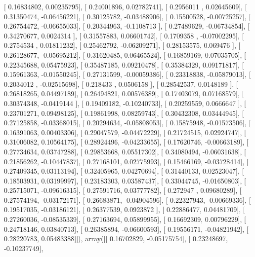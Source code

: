 \documentclass{article}
\begin{document}
       [ 0.16834802,  0.00235795],
       [ 0.24001896,  0.02782741],
       [ 0.2956011 ,  0.02645609],
       [ 0.31350474, -0.06456221],
       [ 0.30125782, -0.03488906],
       [ 0.15500528, -0.00725257],
       [ 0.26754472, -0.06655033],
       [ 0.20344963, -0.1108713 ],
       [ 0.27489629, -0.06734854],
       [ 0.34270677,  0.0024314 ],
       [ 0.31557883,  0.06601742],
       [ 0.1709358 , -0.07002295],
       [ 0.2754534 ,  0.01811232],
       [ 0.25462792, -0.06209271],
       [ 0.28153575,  0.069476  ],
       [ 0.26128677, -0.05695212],
       [ 0.31620485,  0.06465524],
       [ 0.16859169,  0.07035705],
       [ 0.22345688,  0.05475923],
       [ 0.35487185,  0.09210478],
       [ 0.35384329,  0.09171817],
       [ 0.15961363, -0.01550245],
       [ 0.27131599, -0.00059386],
       [ 0.23318838, -0.05879013],
       [ 0.2034012 , -0.02515698],
       [ 0.218433  ,  0.0506158 ],
       [ 0.28542537,  0.0148189 ],
       [ 0.26818265,  0.04497189],
       [ 0.26494821,  0.00576389],
       [ 0.17403079,  0.07168579],
       [ 0.30374348, -0.0419144 ],
       [ 0.19409182, -0.10240733],
       [ 0.20259559,  0.0666647 ],
       [ 0.23701271,  0.09498125],
       [ 0.19861998,  0.08259743],
       [ 0.30432308,  0.03444945],
       [ 0.27125858, -0.03368015],
       [ 0.20294634, -0.05808053],
       [ 0.15875948, -0.01573506],
       [ 0.16391063,  0.00403306],
       [ 0.29047579, -0.04472229],
       [ 0.21724515,  0.02924747],
       [ 0.31006082,  0.10564175],
       [ 0.28924496, -0.04233655],
       [ 0.17620746, -0.00663189],
       [ 0.27734634,  0.03747288],
       [ 0.29853668,  0.05517302],
       [ 0.34080494, -0.06031638],
       [ 0.21856262, -0.10447837],
       [ 0.27168101,  0.02775993],
       [ 0.15466169, -0.03728414],
       [ 0.27409345,  0.03113194],
       [ 0.32405965,  0.04270694],
       [ 0.31440133,  0.02523047],
       [ 0.18503931,  0.03199997],
       [ 0.23183303,  0.03587437],
       [ 0.33044745, -0.01650803],
       [ 0.25715071, -0.09616315],
       [ 0.27591716,  0.03777782],
       [ 0.272947  ,  0.09680289],
       [ 0.27574194, -0.03172171],
       [ 0.26683871, -0.04904596],
       [ 0.22327943, -0.00669336],
       [ 0.19517035, -0.03186121],
       [ 0.26377539,  0.0923872 ],
       [ 0.22886477,  0.04481709],
       [ 0.27260036, -0.08535339],
       [ 0.27163694,  0.05899955],
       [ 0.16692309,  0.00796229],
       [ 0.24718146,  0.03840713],
       [ 0.26385894, -0.06600593],
       [ 0.19556171, -0.04821942],
       [ 0.28220783,  0.05483388]]), array([[ 0.16702829, -0.05175754],
       [ 0.23248697, -0.10237749],
\end{document}
